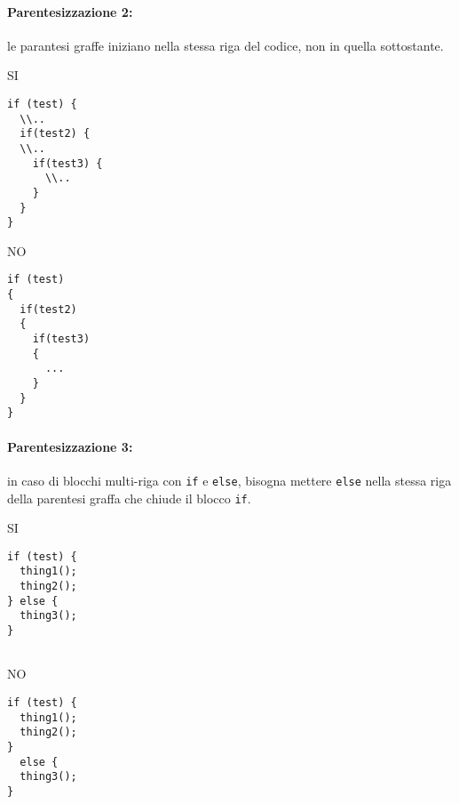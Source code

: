\documentclass[../ProcessiPrimari.tex]{subfiles}
\begin{document}
\paragraph{Parentesizzazione 2:} le parantesi graffe iniziano nella stessa riga del codice, non in quella sottostante.

\begin{center}{
\begin{minipage}{6cm}
	{\begin{center}SI\end{center}}
	\begin{Verbatim}[frame=single]
if (test) {
  \\..
  if(test2) {
  \\..
    if(test3) {
	  \\..
    }
  }
}

	\end{Verbatim}
\end{minipage}
\hfil
\begin{minipage}{6cm}
	{\begin{center}NO\end{center}}
	\begin{Verbatim}[frame=single]
if (test) 
{
  if(test2)
  {
    if(test3)
    {
      ...
    }
  }
}
	\end{Verbatim}
\end{minipage}
}
\end{center}	
\paragraph{Parentesizzazione 3:} in caso di blocchi multi-riga con \texttt{if} e \texttt{else}, bisogna mettere \texttt{else} nella stessa riga della parentesi graffa che chiude il blocco \texttt{if}.

\begin{center}{
\begin{minipage}{6cm}
	{\begin{center}SI\end{center}}
	\begin{Verbatim}[frame=single]
if (test) {
  thing1();
  thing2();
} else {
  thing3();
}
	
	\end{Verbatim}
\end{minipage}
\hfil
\begin{minipage}{6cm}
	{\begin{center}NO\end{center}}
	\begin{Verbatim}[frame=single]
if (test) {
  thing1();
  thing2();
}
  else {
  thing3();
}
	\end{Verbatim}
\end{minipage}
}
\end{center}
\end{document}
